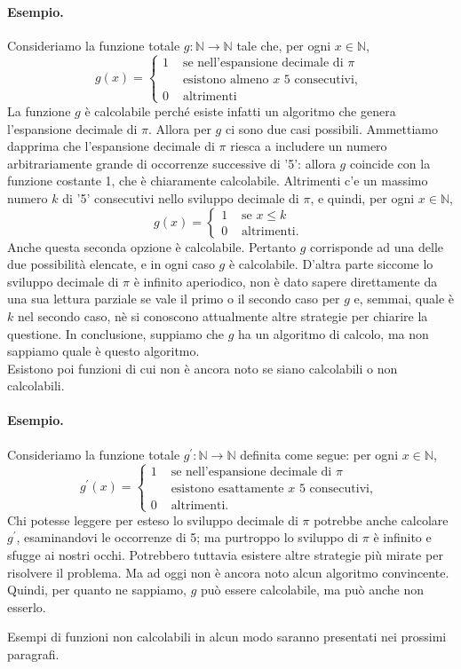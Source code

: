 \paragraph{Esempio.}
Consideriamo la funzione totale $g: \mathbb{N} \rightarrow \mathbb{N}$ tale che, per ogni $x \in
    \mathbb{N}$,
$$
    g(x)= \begin{cases}1 & \text { se nell'espansione decimale di } \pi \\ & \text { esistono almeno } x \text { 5 consecutivi, } \\ 0 & \text { altrimenti }\end{cases}
$$
La funzione $g$ è calcolabile perché esiste infatti un algoritmo che genera
l'espansione decimale di $\pi$. Allora per $g$ ci sono due casi possibili. Ammettiamo
dapprima che l'espansione decimale di $\pi$ riesca a includere un numero
arbitrariamente grande di occorrenze successive di '5': allora $g$ coincide con la
funzione costante 1, che è chiaramente calcolabile. Altrimenti c'e un massimo numero
$k$ di '5' consecutivi nello sviluppo decimale di $\pi$, e quindi, per ogni $x \in
    \mathbb{N}$,
$$
    g(x)= \begin{cases}1 & \text { se } x \leq k \\ 0 & \text { altrimenti. }\end{cases}
$$
Anche questa seconda opzione è calcolabile. Pertanto $g$ corrisponde ad una delle due
possibilità elencate, e in ogni caso $g$ è calcolabile. D'altra parte siccome lo
sviluppo decimale di $\pi$ è infinito aperiodico, non è dato sapere direttamente da
una sua lettura parziale se vale il primo o il secondo caso per $g$ e, semmai, quale
è $k$ nel secondo caso, nè si conoscono attualmente altre strategie per chiarire la
questione. In conclusione, suppiamo che $g$ ha un algoritmo di calcolo, ma non
sappiamo quale è questo algoritmo.\\

Esistono poi funzioni di cui non è ancora noto se
siano calcolabili o non calcolabili.

\paragraph{Esempio.} Consideriamo la funzione totale $g^{\prime}: \mathbb{N} \rightarrow
    \mathbb{N}$ definita come segue: per ogni $x \in \mathbb{N}$,
$$
    g^{\prime}(x)= \begin{cases}1 & \text { se nell'espansione decimale di } \pi \\ & \text { esistono esattamente } x \text { 5 consecutivi, } \\ 0 & \text { altrimenti. }\end{cases}
$$
Chi potesse leggere per esteso lo sviluppo decimale di $\pi$ potrebbe anche calcolare
$g^{\prime}$, esaminandovi le occorrenze di 5; ma purtroppo lo sviluppo di $\pi$ è infinito e
sfugge ai nostri occhi. Potrebbero tuttavia esistere altre strategie più mirate per
risolvere il problema. Ma ad oggi non è ancora noto alcun algoritmo convincente.
Quindi, per quanto ne sappiamo, $g$ può essere calcolabile, ma può anche non esserlo.

Esempi di funzioni non calcolabili in alcun modo saranno presentati nei prossimi
paragrafi.